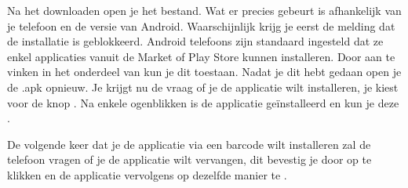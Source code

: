 Na het downloaden open je het bestand. Wat er precies gebeurt is afhankelijk van je telefoon en de versie van Android. Waarschijnlijk krijg je eerst de melding dat de installatie is geblokkeerd. Android telefoons zijn standaard ingesteld dat ze enkel applicaties vanuit de Market of Play Store kunnen installeren. Door  aan te vinken in het  onderdeel van  kun je dit toestaan. Nadat je dit hebt gedaan open je de .apk opnieuw. Je krijgt nu de vraag of je de applicatie wilt installeren, je kiest voor de knop . Na enkele ogenblikken is de applicatie ge\"installeerd en kun je deze . 

De volgende keer dat je de applicatie via een barcode wilt installeren zal de telefoon vragen of je de applicatie wilt vervangen, dit bevestig je door op  te klikken en de applicatie vervolgens op dezelfde manier te .